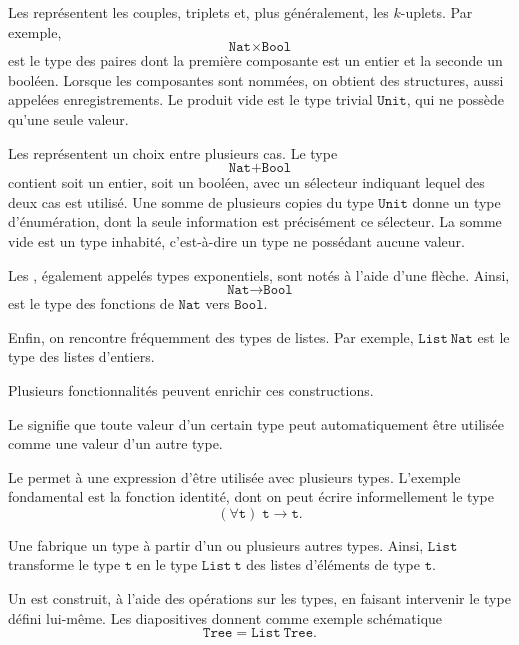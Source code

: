 Les  représentent les couples, triplets et, plus
généralement, les $k$-uplets. Par exemple,
\[
\texttt{Nat}\times\texttt{Bool}
\]
est le type des paires dont la première composante est un entier et la
seconde un booléen. Lorsque les composantes sont nommées, on obtient
des structures, aussi appelées enregistrements. Le produit vide est le
type trivial $\texttt{Unit}$, qui ne possède qu'une seule valeur.

Les  représentent un choix entre plusieurs cas. Le
type
\[
\texttt{Nat}+\texttt{Bool}
\]
contient soit un entier, soit un booléen, avec un sélecteur indiquant
lequel des deux cas est utilisé. Une somme de plusieurs copies du type
$\texttt{Unit}$ donne un type d'énumération, dont la seule information
est précisément ce sélecteur. La somme vide est un type inhabité,
c'est-à-dire un type ne possédant aucune valeur.

Les , également appelés types exponentiels, sont
notés à l'aide d'une flèche. Ainsi,
\[
\texttt{Nat}\rightarrow\texttt{Bool}
\]
est le type des fonctions de $\texttt{Nat}$ vers $\texttt{Bool}$.

Enfin, on rencontre fréquemment des types de listes. Par exemple,
$\texttt{List}~\texttt{Nat}$ est le type des listes d'entiers.

\thingy Plusieurs fonctionnalités peuvent enrichir ces constructions.

Le  signifie que toute valeur d'un certain type peut
automatiquement être utilisée comme une valeur d'un autre type.

Le  permet à une expression d'être utilisée avec
plusieurs types. L'exemple fondamental est la fonction identité, dont
on peut écrire informellement le type
\[
(\forall\mathtt{t})\; \mathtt{t}\rightarrow\mathtt{t}.
\]

Une  fabrique un type à partir d'un ou plusieurs
autres types. Ainsi, $\texttt{List}$ transforme le type $\mathtt{t}$ en
le type $\texttt{List}~\mathtt{t}$ des listes d'éléments de type
$\mathtt{t}$.

Un  est construit, à l'aide des opérations sur les
types, en faisant intervenir le type défini lui-même. Les diapositives
donnent comme exemple schématique
\[
\texttt{Tree}=\texttt{List}~\texttt{Tree}.
\]


